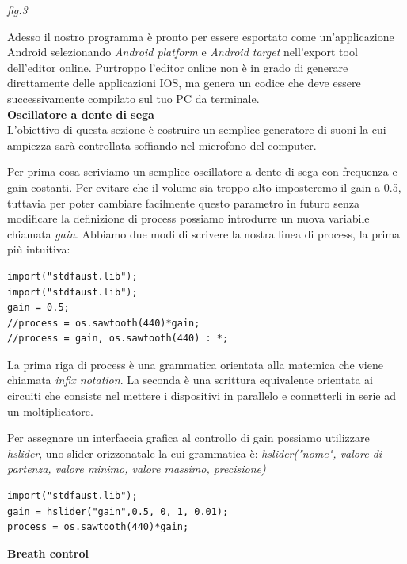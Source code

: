 \documentclass[11pt]{article}
\begin{document}
\begin{multicols*}{2}
\begin{center}
{\scriptsize \emph{fig.3 }}
\end{center}

Adesso il nostro programma è pronto per essere esportato come un'applicazione Android selezionando \textit{Android platform} e \textit{Android target} nell'export tool dell'editor online. Purtroppo l'editor online non è in grado di generare direttamente delle applicazioni IOS, ma genera un codice che deve essere successivamente compilato sul tuo PC da terminale.\\

\textbf{Oscillatore a dente di sega}\\

L'obiettivo di questa sezione è costruire un semplice generatore di suoni la cui ampiezza sarà controllata soffiando nel microfono del computer. 

Per prima cosa scriviamo un semplice oscillatore a dente di sega con frequenza e gain costanti. Per evitare che il volume sia troppo alto imposteremo il gain a 0.5, tuttavia per poter cambiare facilmente questo parametro in futuro senza modificare la definizione di process possiamo introdurre un nuova variabile chiamata \textit{gain}. Abbiamo due modi di scrivere la nostra linea di process, la prima più intuitiva:

\begin{Verbatim}[fontsize=\footnotesize]
import("stdfaust.lib");
import("stdfaust.lib");
gain = 0.5;
//process = os.sawtooth(440)*gain;
//process = gain, os.sawtooth(440) : *;
\end{Verbatim}

La prima riga di process è una grammatica orientata alla matemica che viene chiamata \textit{infix notation}. La seconda è una scrittura equivalente orientata ai circuiti che consiste nel mettere i dispositivi in parallelo e connetterli in serie ad un moltiplicatore.

Per assegnare un interfaccia grafica al controllo di gain possiamo utilizzare \textit{hslider}, uno slider orizzonatale la cui grammatica è: \textit{hslider("nome", valore di partenza, valore minimo, valore massimo, precisione)}

\begin{Verbatim}[fontsize=\footnotesize]
import("stdfaust.lib");
gain = hslider("gain",0.5, 0, 1, 0.01);
process = os.sawtooth(440)*gain;
\end{Verbatim}

\textbf{Breath control}\\


\end{multicols*}
\end{document}
